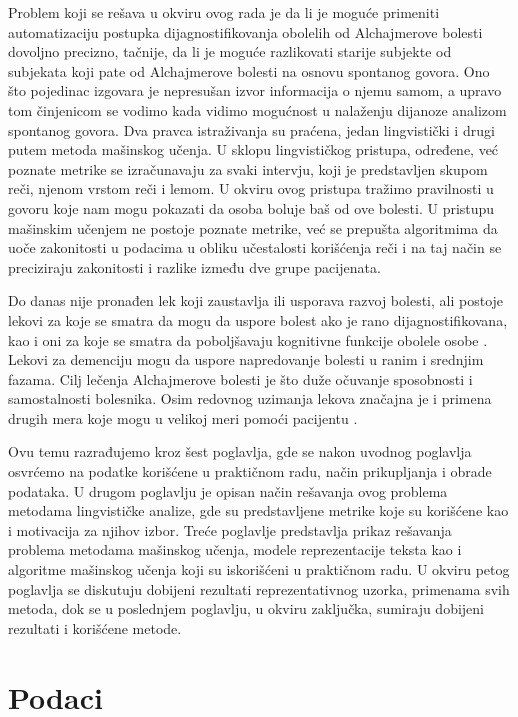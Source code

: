 \documentclass[12pt,oneside]{memoir}
\begin{document}
Problem koji se rešava u okviru ovog rada je da li je moguće primeniti automatizaciju postupka dijagnostifikovanja obolelih od Alchajmerove bolesti dovoljno precizno, tačnije, da li je moguće razlikovati starije subjekte od subjekata koji pate od Alchajmerove bolesti na osnovu spontanog govora. Ono što pojedinac izgovara je nepresušan izvor informacija o njemu samom, a upravo tom činjenicom se vodimo kada vidimo mogućnost u nalaženju dijanoze analizom spontanog govora. Dva pravca istraživanja su praćena, jedan lingvistički i drugi putem metoda mašinskog učenja. U sklopu lingvističkog pristupa,  određene, već poznate metrike se izračunavaju za svaki intervju, koji je predstavljen skupom reči, njenom vrstom reči i lemom. U okviru ovog pristupa tražimo pravilnosti u govoru koje nam mogu pokazati da osoba boluje baš od ove bolesti. U pristupu mašinskim učenjem ne postoje poznate metrike, već se prepušta algoritmima da uoče zakonitosti u podacima u obliku učestalosti korišćenja reči i na taj način se preciziraju zakonitosti i razlike između dve grupe pacijenata.

Do danas nije pronađen lek koji zaustavlja ili usporava razvoj bolesti, ali postoje lekovi za koje se smatra da mogu da uspore bolest ako je rano dijagnostifikovana, kao i oni za koje se smatra da poboljšavaju kognitivne funkcije obolele osobe \cite{Alzheimerfactsfigures}. Lekovi za demenciju mogu da uspore napredovanje bolesti u ranim i srednjim fazama.  Cilj lečenja Alchajmerove bolesti je što duže očuvanje sposobnosti i samostalnosti bolesnika. Osim redovnog uzimanja lekova značajna je i primena drugih mera koje mogu u velikoj meri pomoći pacijentu \cite{medicor}.

Ovu temu razrađujemo kroz šest poglavlja, gde se nakon uvodnog poglavlja osvrćemo na podatke korišćene u praktičnom radu, način prikupljanja i obrade podataka. U drugom poglavlju je opisan način rešavanja ovog problema metodama lingvističke analize, gde su predstavljene metrike koje su korišćene kao i motivacija za njihov izbor. Treće poglavlje predstavlja prikaz rešavanja problema metodama mašinskog učenja, modele reprezentacije teksta kao i algoritme mašinskog učenja koji su iskorišćeni u praktičnom radu. U okviru petog poglavlja se diskutuju dobijeni rezultati reprezentativnog uzorka, primenama svih metoda, dok se u poslednjem poglavlju, u okviru zaključka, sumiraju dobijeni rezultati i korišćene metode.

\chapter{Podaci}
\end{document}
